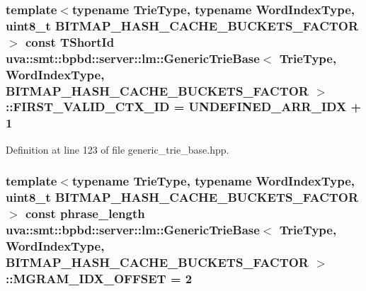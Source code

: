 \subsubsection[{F\+I\+R\+S\+T\+\_\+\+V\+A\+L\+I\+D\+\_\+\+C\+T\+X\+\_\+\+I\+D}]{\setlength{\rightskip}{0pt plus 5cm}template$<$typename Trie\+Type, typename Word\+Index\+Type, uint8\+\_\+t B\+I\+T\+M\+A\+P\+\_\+\+H\+A\+S\+H\+\_\+\+C\+A\+C\+H\+E\+\_\+\+B\+U\+C\+K\+E\+T\+S\+\_\+\+F\+A\+C\+T\+O\+R$>$ const {\bf T\+Short\+Id} {\bf uva\+::smt\+::bpbd\+::server\+::lm\+::\+Generic\+Trie\+Base}$<$ Trie\+Type, {\bf Word\+Index\+Type}, B\+I\+T\+M\+A\+P\+\_\+\+H\+A\+S\+H\+\_\+\+C\+A\+C\+H\+E\+\_\+\+B\+U\+C\+K\+E\+T\+S\+\_\+\+F\+A\+C\+T\+O\+R $>$\+::F\+I\+R\+S\+T\+\_\+\+V\+A\+L\+I\+D\+\_\+\+C\+T\+X\+\_\+\+I\+D = {\bf U\+N\+D\+E\+F\+I\+N\+E\+D\+\_\+\+A\+R\+R\+\_\+\+I\+D\+X} + 1\hspace{0.3cm}{\ttfamily [static]}}\label{classuva_1_1smt_1_1bpbd_1_1server_1_1lm_1_1_generic_trie_base_a6876a5cd50fce0cbb8066a420a42d6c0}


Definition at line 123 of file generic\+\_\+trie\+\_\+base.\+hpp.

\hypertarget{classuva_1_1smt_1_1bpbd_1_1server_1_1lm_1_1_generic_trie_base_a39479f9edbb672ffdc4f52b0dcdc20f2}{}
\subsubsection[{M\+G\+R\+A\+M\+\_\+\+I\+D\+X\+\_\+\+O\+F\+F\+S\+E\+T}]{\setlength{\rightskip}{0pt plus 5cm}template$<$typename Trie\+Type, typename Word\+Index\+Type, uint8\+\_\+t B\+I\+T\+M\+A\+P\+\_\+\+H\+A\+S\+H\+\_\+\+C\+A\+C\+H\+E\+\_\+\+B\+U\+C\+K\+E\+T\+S\+\_\+\+F\+A\+C\+T\+O\+R$>$ const {\bf phrase\+\_\+length} {\bf uva\+::smt\+::bpbd\+::server\+::lm\+::\+Generic\+Trie\+Base}$<$ Trie\+Type, {\bf Word\+Index\+Type}, B\+I\+T\+M\+A\+P\+\_\+\+H\+A\+S\+H\+\_\+\+C\+A\+C\+H\+E\+\_\+\+B\+U\+C\+K\+E\+T\+S\+\_\+\+F\+A\+C\+T\+O\+R $>$\+::M\+G\+R\+A\+M\+\_\+\+I\+D\+X\+\_\+\+O\+F\+F\+S\+E\+T = 2\hspace{0.3cm}{\ttfamily [static]}}\label{classuva_1_1smt_1_1bpbd_1_1server_1_1lm_1_1_generic_trie_base_a39479f9edbb672ffdc4f52b0dcdc20f2}


